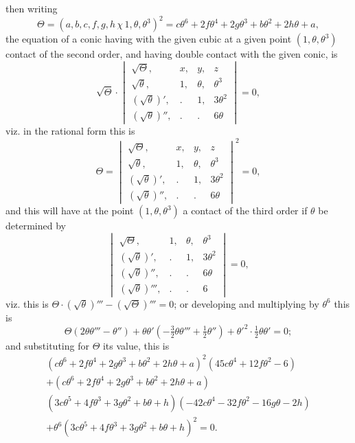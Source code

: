 \documentclass[11pt,a4paper]{article}
\theoremstyle{definition}
\begin{document}
\noindent then writing
\[
\Theta = (a, b, c, f, g, h \,\chi\, 1, \theta, \theta^3)^2 = c\theta^6 + 2f\theta^4 + 2g\theta^3 + b\theta^2 + 2h\theta + a,
\]
the equation of a conic having with the given cubic at a given point $(1, \theta, \theta^3)$ contact of the second order, and having double contact with the given conic, is
\[
\sqrt{\Theta} \cdot \begin{vmatrix}
\sqrt{\Theta}, & x, & y, & z \\
\sqrt{\theta}, & 1, & \theta, & \theta^3 \\
(\sqrt{\theta})', & . & 1, & 3\theta^2 \\
(\sqrt{\theta})'', & . & . & 6\theta
\end{vmatrix} = 0,
\]
viz. in the rational form this is
\[
\Theta = \begin{vmatrix}
\sqrt{\Theta}, & x, & y, & z \\
\sqrt{\theta}, & 1, & \theta, & \theta^3 \\
(\sqrt{\theta})', & . & 1, & 3\theta^2 \\
(\sqrt{\theta})'', & . & . & 6\theta
\end{vmatrix}^2 = 0,
\]
and this will have at the point $(1, \theta, \theta^3)$ a contact of the third order if $\theta$ be determined by
\[
\begin{vmatrix}
\sqrt{\Theta}, & 1, & \theta, & \theta^3 \\
(\sqrt{\theta})', & . & 1, & 3\theta^2 \\
(\sqrt{\theta})'', & . & . & 6\theta \\
(\sqrt{\theta})''', & . & . & 6
\end{vmatrix} = 0,
\]
viz. this is $\Theta \cdot (\sqrt{\theta})''' - (\sqrt{\Theta})''' = 0$; or developing and multiplying by $\theta^6$ this is
\[
\Theta(2\theta\theta''' - \theta'') + \theta\theta'(-\tfrac{3}{2}\theta\theta''' + \tfrac{1}{2}\theta'') + \theta'^2 \cdot \tfrac{1}{2}\theta\theta' = 0;
\]
and substituting for $\Theta$ its value, this is
\begin{multline*}
(c\theta^6 + 2f\theta^4 + 2g\theta^3 + b\theta^2 + 2h\theta + a)^2(45c\theta^4 + 12f\theta^2 - 6)\\
+ (c\theta^6 + 2f\theta^4 + 2g\theta^3 + b\theta^2 + 2h\theta + a)\\
(3c\theta^5 + 4f\theta^3 + 3g\theta^2 + b\theta + h)(-42c\theta^4 - 32f\theta^2 - 16g\theta - 2h)\\
+ \theta^6(3c\theta^5 + 4f\theta^3 + 3g\theta^2 + b\theta + h)^2 = 0.
\end{multline*}
\end{document}
